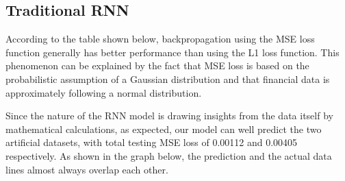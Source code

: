 \documentclass[letterpaper, 10 pt, conference]{ieeeconf}  %
\begin{document}
    \begin{table*}[t]
        \centering
        \captionsetup{justification=centering,margin=2cm}
        \caption{Table containing the final loss (MSE and L1) of testing and training after 50 epochs for LSTM.}
    \end{table*}

    \subsection{Traditional RNN}
        According to the table shown below, backpropagation using the MSE loss function generally has better performance than using the L1 loss function. This phenomenon can be explained by the fact that MSE loss is based on the probabilistic assumption of a Gaussian distribution and that financial data is approximately following a normal distribution. 
    
        Since the nature of the RNN model is drawing insights from the data itself by mathematical calculations, as expected, our model can well predict the two artificial datasets, with total testing MSE loss of 0.00112 and 0.00405 respectively. As shown in the graph below, the prediction and the actual data lines almost always overlap each other.
 
\end{document}
